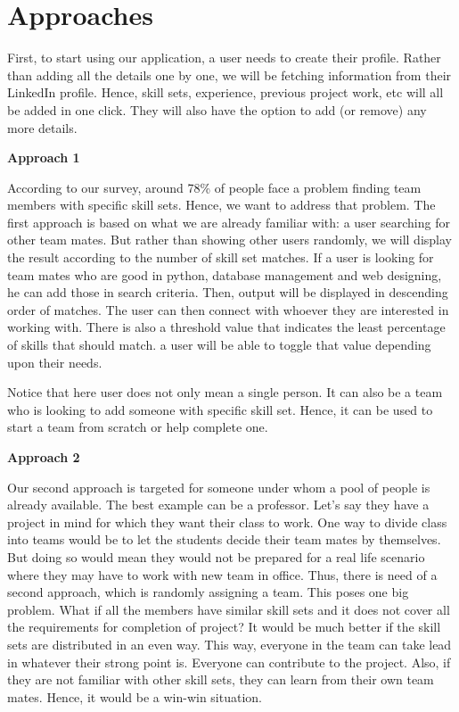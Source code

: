 \documentclass[conference]{IEEEtran}
\begin{document}
\section{Approaches}
First, to start using our application, a user needs to create their profile. Rather than adding all the details one by one, we will be fetching information from their LinkedIn profile. Hence, skill sets, experience, previous project work, etc will all be added in one click. They will also have the option to add (or remove) any more details.

\textbf{Approach 1}

According to our survey, around 78\% of people face a problem finding team members with specific skill sets. Hence, we want to address that problem. The first approach is based on what we are already familiar with: a user searching for other team mates. But rather than showing other users randomly, we will display the result according to the number of skill set matches. If a user is looking for team mates who are good in python, database management and web designing, he can add those in search criteria. Then, output will be displayed in descending order of matches. The user can then connect with whoever they are interested in working with. There is also a threshold value that indicates the least percentage of skills that should match. a user will be able to toggle that value depending upon their needs.  

Notice that here user does not only mean a single person. It can also be a team who is looking to add someone with specific skill set. Hence, it can be used to start a team from scratch or help complete one.



\textbf{Approach 2}

Our second approach is targeted for someone under whom a pool of people is already available. The best example can be a professor. Let’s say they have a project in mind for which they want their class to work. One way to divide class into teams would be to let the students decide their team mates by themselves. But doing so would mean they would not be prepared for a real life scenario where they may have to work with new team in office. Thus, there is need of a second approach, which is randomly assigning a team. This poses one big problem. What if all the members have similar skill sets and it does not cover all the requirements for completion of project? It would be much better if the skill sets are distributed in an even way. This way, everyone in the team can take lead in whatever their strong point is. Everyone can contribute to the project. Also, if they are not familiar with other skill sets, they can learn from their own team mates. Hence, it would be a win-win situation.
\end{document}
